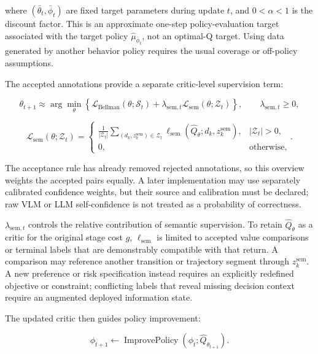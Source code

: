 \documentclass[a4paper]{article}
\begin{document}
where $(\bar\theta_t,\bar\phi_t)$ are fixed target parameters during update
$t$, and $0<\alpha<1$ is the discount factor. This is an approximate one-step
policy-evaluation target associated with the target policy
$\widehat\mu_{\bar\phi_t}$, not an optimal-Q target. Using data generated by
another behavior policy requires the usual coverage or off-policy assumptions.

The accepted annotations provide a separate critic-level supervision term:

\begin{equation}
\theta_{t+1}
\approx
\arg\min_\theta
\left\{
\mathcal L_{\mathrm{Bellman}}(\theta;\mathcal S_t)
+
\lambda_{\mathrm{sem},t}
\mathcal L_{\mathrm{sem}}(\theta;\mathcal Z_t)
\right\},
\qquad
\lambda_{\mathrm{sem},t}\ge0,
\end{equation}

\begin{equation}
\mathcal L_{\mathrm{sem}}(\theta;\mathcal Z_t)
=
\begin{cases}
\displaystyle
\frac{1}{|\mathcal Z_t|}
\sum_{(d_k,z_k^{\mathrm{sem}})\in\mathcal Z_t}
\ell_{\mathrm{sem}}
\!\left(
\widehat Q_\theta;
d_k,z_k^{\mathrm{sem}}
\right),
& |\mathcal Z_t|>0,\\
0,
& \text{otherwise},
\end{cases}.
\end{equation}

The acceptance rule has already removed rejected annotations, so this
overview weights the accepted pairs equally. A later implementation may use
separately calibrated confidence weights, but their source and calibration
must be declared; raw VLM or LLM self-confidence is not treated as a
probability of correctness.

$\lambda_{\mathrm{sem},t}$ controls the relative contribution of semantic
supervision. To retain $\widehat Q_\theta$ as a critic for the original stage
cost $g$, $\ell_{\mathrm{sem}}$ is limited to accepted value comparisons or
terminal labels that are demonstrably compatible with that return. A
comparison may reference another transition or trajectory segment through
$z_k^{\mathrm{sem}}$. A new preference or risk specification instead requires
an explicitly redefined objective or constraint; conflicting labels that
reveal missing decision context require an augmented deployed information
state.

The updated critic then guides policy improvement:

\begin{equation}
\phi_{t+1}
\leftarrow
\operatorname{ImprovePolicy}
\!\left(
\phi_t;\widehat Q_{\theta_{t+1}}
\right).
\end{equation}
\end{document}
